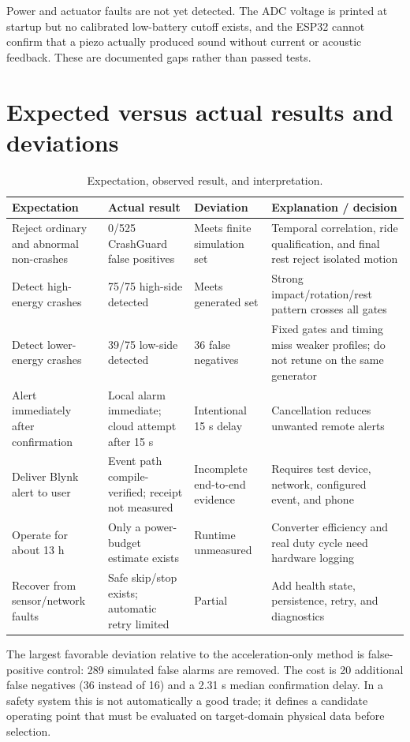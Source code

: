 \documentclass[12pt,a4paper]{article}
\begin{document}
Power and actuator faults are not yet detected. The ADC voltage is printed at
startup but no calibrated low-battery cutoff exists, and the ESP32 cannot
confirm that a piezo actually produced sound without current or acoustic
feedback. These are documented gaps rather than passed tests.

\section{Expected versus actual results and deviations}
\label{sec:deviations}

\begin{table}[H]
\centering
\footnotesize
\caption{Expectation, observed result, and interpretation.}
\begin{tabularx}{\textwidth}{@{}p{}p{}p{}X@{}}
\toprule
Expectation & Actual result & Deviation & Explanation / decision \\
\midrule
Reject ordinary and abnormal non-crashes & 0/525 CrashGuard false positives & Meets finite simulation set & Temporal correlation, ride qualification, and final rest reject isolated motion \\
Detect high-energy crashes & 75/75 high-side detected & Meets generated set & Strong impact/rotation/rest pattern crosses all gates \\
Detect lower-energy crashes & 39/75 low-side detected & 36 false negatives & Fixed gates and timing miss weaker profiles; do not retune on the same generator \\
Alert immediately after confirmation & Local alarm immediate; cloud attempt after 15 s & Intentional 15 s delay & Cancellation reduces unwanted remote alerts \\
Deliver Blynk alert to user & Event path compile-verified; receipt not measured & Incomplete end-to-end evidence & Requires test device, network, configured event, and phone \\
Operate for about 13 h & Only a power-budget estimate exists & Runtime unmeasured & Converter efficiency and real duty cycle need hardware logging \\
Recover from sensor/network faults & Safe skip/stop exists; automatic retry limited & Partial & Add health state, persistence, retry, and diagnostics \\
\bottomrule
\end{tabularx}
\end{table}

The largest favorable deviation relative to the acceleration-only method is
false-positive control: 289 simulated false alarms are removed. The cost is 20
additional false negatives (36 instead of 16) and a 2.31 s median confirmation
delay. In a safety system this is not automatically a good trade; it defines a
candidate operating point that must be evaluated on target-domain physical
data before selection.
\end{document}
